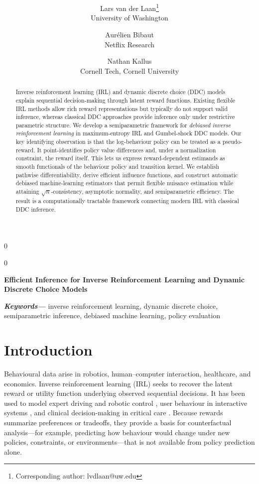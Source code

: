 \documentclass[12pt]{article}
\title{\bf \JASATitleText}
\author{
  Lars van der Laan\thanks{Corresponding author: lvdlaan@uw.edu} \\
  University of Washington \\
  \and
  Aur\'elien Bibaut \\
  Netflix Research \\
  \and
  Nathan Kallus \\
  Cornell Tech, Cornell University
}
\theoremstyle{plain}
\def\spacingset#1{\renewcommand{\baselinestretch}{#1}\small\normalsize}
\newcommand{\blind}{0}
\providecommand{\keywords}[1]{\small{\textbf{\textit{Keywords---}} #1}}
\newcommand{\JASATitleText}{Efficient Inference for Inverse Reinforcement Learning and Dynamic Discrete Choice Models}
\begin{document}
\blind
{
  \maketitle
} \fi

\blind
{
  \bigskip
  \bigskip
  \bigskip
  \begin{center}
    {\LARGE\bf \JASATitleText}
  \end{center}
  \medskip
} \fi

\bigskip
\begin{abstract}
Inverse reinforcement learning (IRL) and dynamic discrete choice (DDC) models
explain sequential decision-making through latent reward functions. Existing
flexible IRL methods allow rich reward representations but typically do not
support valid inference, whereas classical DDC approaches provide inference only
under restrictive parametric structure. We develop a semiparametric framework
for \emph{debiased inverse reinforcement learning} in maximum-entropy IRL and
Gumbel-shock DDC models. Our key identifying observation is that the
log-behaviour policy can be treated as a pseudo-reward. It point-identifies
policy value differences and, under a normalization constraint, the reward
itself. This lets us express reward-dependent estimands as smooth functionals of
the behaviour policy and transition kernel. We establish pathwise
differentiability,
derive efficient influence functions, and construct automatic debiased
machine-learning estimators that permit flexible nuisance estimation while
attaining \(\sqrt{n}\)-consistency, asymptotic normality, and semiparametric
efficiency. The result is a computationally tractable framework connecting
modern IRL with classical DDC inference.
\end{abstract}

\noindent
\keywords{inverse reinforcement learning, dynamic discrete choice, semiparametric inference, debiased machine learning, policy evaluation}
\newpage
\spacingset{1.9}  %


\section{Introduction}
\label{sec:intro}
Behavioural data arise in robotics, human--computer interaction, healthcare,
and economics. Inverse reinforcement learning (IRL) seeks to recover the
latent reward or utility function underlying observed sequential decisions. It
has been used to model expert driving and robotic control
\citep[e.g.][]{abbeel2004apprenticeship,wulfmeier2015deep},
user behaviour in interactive systems
\citep[e.g.][]{chandramohan2012user,hossain2023bayesian},
and clinical decision-making in critical care
\citep[e.g.][]{yu2019inverse,bovenzi2025identifying}. Because rewards summarize preferences or tradeoffs, they provide a basis for
counterfactual analysis---for example, predicting how behaviour would change
under new policies, constraints, or environments---that is not available from
policy prediction alone.
\end{document}
